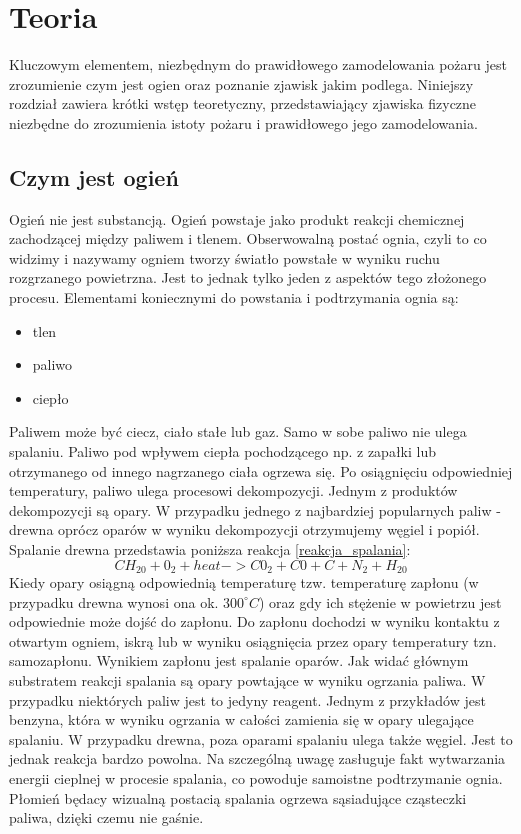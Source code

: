 ﻿%
\chapter{Teoria}
\label{cha:Teoria}
Kluczowym elementem, niezbędnym do prawidłowego zamodelowania pożaru
jest zrozumienie czym jest ogien oraz poznanie zjawisk jakim podlega. Niniejszy rozdział zawiera
krótki wstęp teoretyczny, przedstawiający zjawiska fizyczne niezbędne do zrozumienia istoty 
pożaru i prawidłowego jego zamodelowania.
\section {Czym jest ogień}
Ogień nie jest substancją.
Ogień powstaje jako produkt reakcji chemicznej zachodzącej między paliwem i tlenem.
Obserwowalną postać ognia, czyli to co widzimy i nazywamy ogniem tworzy światło powstałe w wyniku ruchu rozgrzanego powietrzna.
Jest to jednak tylko jeden z aspektów tego złożonego procesu.
Elementami koniecznymi do powstania i podtrzymania ognia są:
\begin{itemize}
\item tlen
\item paliwo
\item ciepło
\end{itemize}


Paliwem może być ciecz, ciało stałe lub gaz. Samo w sobe paliwo nie ulega spalaniu. 
Paliwo pod wpływem ciepła pochodzącego np. z zapałki lub otrzymanego od innego nagrzanego ciała ogrzewa się. Po osiągnięciu
odpowiedniej temperatury, paliwo ulega procesowi dekompozycji. Jednym z produktów dekompozycji
są opary. W przypadku jednego z najbardziej popularnych paliw - drewna oprócz oparów w wyniku dekompozycji otrzymujemy węgiel i popiół.
Spalanie drewna przedstawia poniższa reakcja \ref{reakcja_spalania}:
\begin {equation}
CH_20+0_2+heat ->C0_2 + C0+ C + N_2 + H_20
\label {reakcja_spalania}
\end {equation}
Kiedy opary osiągną odpowiednią temperaturę tzw. temperaturę zapłonu (w przypadku drewna wynosi ona ok. $300^\circ C$) oraz gdy ich stężenie
w powietrzu jest odpowiednie może dojść do zapłonu. Do zapłonu dochodzi w wyniku kontaktu z otwartym ogniem, iskrą lub w wyniku osiągnięcia
przez opary temperatury tzn. samozapłonu. Wynikiem zapłonu jest spalanie oparów. Jak widać głównym substratem reakcji spalania są opary powtające w wyniku
ogrzania paliwa. W przypadku niektórych paliw jest to jedyny reagent. Jednym z przykładów jest benzyna, która w wyniku ogrzania w całości zamienia się w opary ulegające spalaniu. W przypadku drewna, poza oparami spalaniu ulega także węgiel. Jest to jednak reakcja bardzo powolna.
Na szczególną uwagę zasługuje fakt wytwarzania energii cieplnej w procesie spalania, co powoduje samoistne podtrzymanie ognia. Płomień będacy
wizualną postacią spalania ogrzewa sąsiadujące cząsteczki paliwa, dzięki czemu nie gaśnie.


